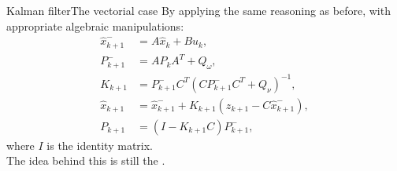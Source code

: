 \begin{frame}{Kalman filter}{The vectorial case}
  By applying the same reasoning as before, with appropriate algebraic manipulations:
  \begin{subequations}
    \begin{align}
      \hat{x}_{k+1}^{-} &= A\hat{x}_k + Bu_k,\label{eq:predictionxvec}\\
      P_{k+1}^{-} &= AP_kA^T + Q_{\omega},\label{eq:predictioncovvec}\\
      K_{k+1} &= P_{k+1}^{-}C^T(CP_{k+1}^{-}C^T + Q_{\nu})^{-1},\label{eq:kalmangainvec}\\
      \hat{x}_{k+1} &= \hat{x}_{k+1}^{-} + K_{k+1}(z_{k+1} - C\hat{x}_{k+1}^{-}),\label{eq:innovxvec}\\
      P_{k+1} &= (I - K_{k+1}C)P_{k+1}^{-},\label{eq:innovcovvec}
    \end{align}
  \end{subequations}
  where $I$ is the identity matrix.\\
  The idea behind this is still the .
\end{frame}

